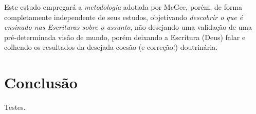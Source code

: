     Este estudo empregará a \emph{metodologia} adotada por McGee, porém, de forma completamente independente  de  seus  estudos,
    objetivando \emph{descobrir o que é  ensinado  nas  Escrituras  sobre  o  assunto},  não  desejando  uma  validação  de  uma
    pré-determinada visão de mundo, porém deixando a Escritura (Deus) falar e colhendo  os  resultados  da  desejada  coesão  (e
    correção!) doutrinária.



\section{Conclusão}

    Testes.

